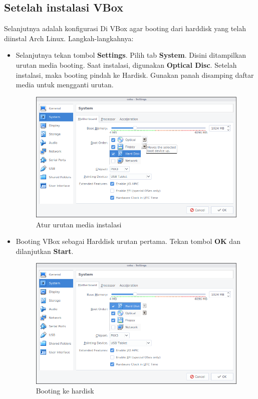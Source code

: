 \documentclass[12pt,]{article}
\begin{document}
	\subsection{Setelah instalasi VBox}
	Selanjutnya adalah konfigurasi Di VBox agar booting dari harddisk yang telah diinstal Arch Linux.
	Langkah-langkahnya:
	\begin{itemize}
		\item Selanjutnya tekan tombol \textbf{Settings}. Pilih tab \textbf{System}.
		Disini ditampilkan urutan media booting.
		Saat instalasi, digunakan \textbf{Optical Disc}.
		Setelah instalasi, maka booting pindah ke Hardisk.
		Gunakan panah disamping daftar media untuk mengganti urutan. 
		\begin{figure}[H]
			\centering
			\includegraphics[width=0.6\linewidth]{images/vbox_afterinstall/s1}
			\caption{Atur urutan media instalasi}
		\end{figure}
	
		\item Booting VBox sebagai Harddisk urutan pertama.
		Tekan tombol \textbf{OK} dan dilanjutkan \textbf{Start}.
			\begin{figure}[H]
			\centering
			\includegraphics[width=0.6\linewidth]{images/vbox_afterinstall/s2}
			\caption{Booting ke hardisk}
		\end{figure}
	

\end{itemize}
\end{document}
